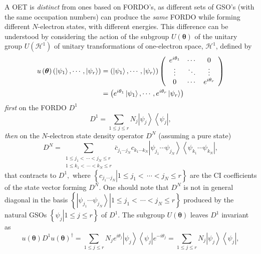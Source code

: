 \documentclass[aps,preprint]{revtex4}%
\begin{document}
A OET is \emph{distinct} from ones based on FORDO's, as different sets of
GSO's (with the same occupation numbers) can produce the \emph{same} FORDO
while forming different $N$-electron states, with different energies. This
difference can be understood by considering the action of the subgroup
$U\left(  \boldsymbol{\theta}\right)  $ of the unitary group $U\left(
\mathcal{H}^{1}\right)  $ of unitary transformations of one-electron space,
$\mathcal{H}^{1}$, defined by
\begin{align}
u\left(  \boldsymbol{\theta}\right)  \left(  \left\vert \psi_{1}\right\rangle
,\cdots,\left\vert \psi_{r}\right\rangle \right)   &  =\left(  \left\vert
\psi_{1}\right\rangle ,\cdots,\left\vert \psi_{r}\right\rangle \right)
\left(
\begin{array}
[c]{ccc}%
e^{i\theta_{1}} & \cdots & 0\\
\vdots & \ddots & \vdots\\
0 & \cdots & e^{i\theta_{r}}%
\end{array}
\right) \nonumber\\
&  =\left(  e^{i\theta_{1}}\left\vert \psi_{1}\right\rangle ,\cdots
,e^{i\theta_{r}}\left\vert \psi_{r}\right\rangle \right)
\end{align}
\emph{first} on the FORDO $D^{1}$
\begin{equation}
D^{1}=\sum_{1\leq j\leq r}N_{j}\left\vert \psi_{j}\right\rangle \left\langle
\psi_{j}\right\vert ,
\end{equation}
\emph{then} on the $N$-electron state density operator $D^{N}$ (assuming a
pure state)
\begin{equation}
D^{N}=\sum_{\substack{1\leq j_{1}<\,\cdots<j_{N}\leq r\\1\leq k_{1}%
<\,\cdots<k_{N}\leq r}}\bar{c}_{j_{1}\cdots j_{N}}c_{k_{1}\cdots k_{N}%
}\left\vert \psi_{j_{1}}\cdots\psi_{j_{N}}\right\rangle \left\langle
\psi_{k_{1}}\cdots\psi_{k_{N}}\right\vert ,
\end{equation}
that contracts to $D^{1},$ where $\left\{  \left.  c_{j_{1}\cdots j_{N}%
}\right\vert 1\leq j_{1}<\,\cdots<j_{N}\leq r\right\}  $ are the CI
coefficients of the state vector forming $D^{N}$. One should note that $D^{N}$
is not in general diagonal in the basis $\left\{  \left.  \left\vert
\psi_{j_{1}}\cdots\psi_{j_{N}}\right\rangle \right\vert 1\leq j_{1}%
<\,\cdots<j_{N}\leq r\right\}  $ produced by the natural GSOs $\left\{
\left.  \psi_{j}\right\vert 1\leq j\leq r\right\}  $ of $D^{1}$. The subgroup
$U\left(  \boldsymbol{\theta}\right)  $ leaves $D^{1}$ invariant as
\begin{equation}
u\left(  \boldsymbol{\theta}\right)  D^{1}u\left(  \boldsymbol{\theta}\right)
^{\dagger}=\sum_{1\leq j\leq r}N_{j}e^{i\theta_{j}}\left\vert \psi
_{j}\right\rangle \left\langle \psi_{j}\right\vert e^{-i\theta_{j}}%
=\sum_{1\leq j\leq r}N_{j}\left\vert \psi_{j}\right\rangle \left\langle
\psi_{j}\right\vert ,
\end{equation}
\end{document}
